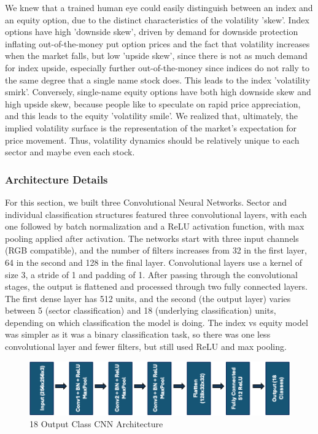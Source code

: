 \documentclass[10pt]{article}
\begin{document}
We knew that a trained human eye could easily distinguish between an index and an equity option, due to the distinct characteristics of the volatility 'skew'\cite{xing2010does}. Index options have high 'downside skew', driven by demand for downside protection inflating out-of-the-money put option prices and the fact that volatility increases when the market falls, but low 'upside skew', since there is not as much demand for index upside, especially further out-of-the-money since indices do not rally to the same degree that a single name stock does\cite{ang2006cross}. This leads to the index 'volatility smirk'. Conversely, single-name equity options have both high downside skew and high upside skew, because people like to speculate on rapid price appreciation, and this leads to the equity 'volatility smile'. We realized that, ultimately, the implied volatility surface is the representation of the market's expectation for price movement. Thus, volatility dynamics should be relatively unique to each sector and maybe even each stock. 

\subsubsection{Architecture Details}
For this section, we built three Convolutional Neural Networks. Sector and individual classification structures featured three convolutional layers, with each one followed by batch normalization and a ReLU activation function, with max pooling applied after activation. The networks start with three input channels (RGB compatible), and the number of filters increases from 32 in the first layer, 64 in the second and 128 in the final layer. Convolutional layers use a kernel of size 3, a stride of 1 and padding of 1. After passing through the convolutional stages, the output is flattened and processed through two fully connected layers. The first dense layer has 512 units, and the second (the output layer) varies between 5 (sector classification) and 18 (underlying classification) units, depending on which classification the model is doing. The index vs equity model was simpler as it was a binary classification task, so there was one less convolutional layer and fewer filters, but still used ReLU and max pooling.

\begin{figure}[H]
    \centering
    \includegraphics[width=0.5\linewidth]{cnn box.png}
    \caption{18 Output Class CNN Architecture}
    \label{fig:enter-label}
\end{figure}
\end{document}
